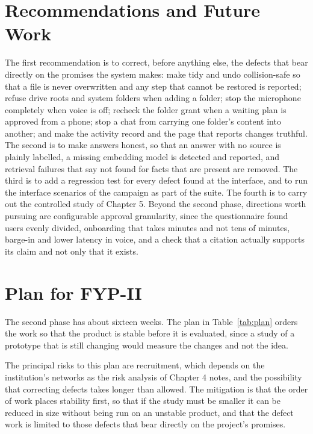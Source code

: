 \documentclass{FastFyp}
\begin{document}
\section{Recommendations and Future Work}
The first recommendation is to correct, before anything else, the defects that bear directly on the promises the system makes: make tidy and undo collision-safe so that a file is never overwritten and any step that cannot be restored is reported; refuse drive roots and system folders when adding a folder; stop the microphone completely when voice is off; recheck the folder grant when a waiting plan is approved from a phone; stop a chat from carrying one folder's content into another; and make the activity record and the page that reports changes truthful. The second is to make answers honest, so that an answer with no source is plainly labelled, a missing embedding model is detected and reported, and retrieval failures that say not found for facts that are present are removed. The third is to add a regression test for every defect found at the interface, and to run the interface scenarios of the campaign as part of the suite. The fourth is to carry out the controlled study of Chapter 5. Beyond the second phase, directions worth pursuing are configurable approval granularity, since the questionnaire found users evenly divided, onboarding that takes minutes and not tens of minutes, barge-in and lower latency in voice, and a check that a citation actually supports its claim and not only that it exists.

\section{Plan for FYP-II}
The second phase has about sixteen weeks. The plan in Table~\ref{tab:plan} orders the work so that the product is stable before it is evaluated, since a study of a prototype that is still changing would measure the changes and not the idea.

The principal risks to this plan are recruitment, which depends on the institution's networks as the risk analysis of Chapter 4 notes, and the possibility that correcting defects takes longer than allowed. The mitigation is that the order of work places stability first, so that if the study must be smaller it can be reduced in size without being run on an unstable product, and that the defect work is limited to those defects that bear directly on the project's promises.
\end{document}

